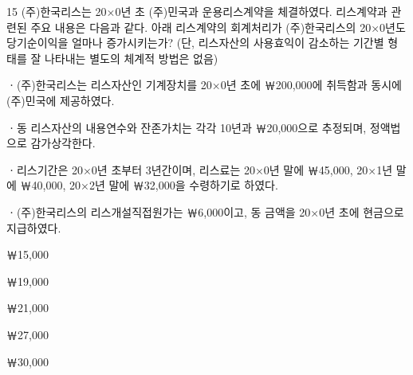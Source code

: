 \begin{question}{15}
(주)한국리스는 20×0년 초 (주)민국과 운용리스계약을 체결하였다. 리스계약과 관련된 주요 내용은 다음과 같다. 아래 리스계약의 회계처리가 (주)한국리스의 20×0년도 당기순이익을 얼마나 증가시키는가? (단, 리스자산의 사용효익이 감소하는 기간별 형태를 잘 나타내는 별도의 체계적 방법은 없음)
\begin{framedtext}
ㆍ(주)한국리스는 리스자산인 기계장치를 20×0년 초에 ￦200,000에 취득함과 동시에 (주)민국에 제공하였다. \par
ㆍ동 리스자산의 내용연수와 잔존가치는 각각 10년과 ￦20,000으로 추정되며, 정액법으로 감가상각한다. \par
ㆍ리스기간은 20×0년 초부터 3년간이며, 리스료는 20×0년 말에 ￦45,000, 20×1년 말에 ￦40,000, 20×2년 말에 ￦32,000을 수령하기로 하였다. \par
ㆍ(주)한국리스의 리스개설직접원가는 ￦6,000이고, 동 금액을 20×0년 초에 현금으로 지급하였다. \par
\end{framedtext}
\begin{choices}
  \item ￦15,000
  \item ￦19,000
  \item ￦21,000
  \item ￦27,000
  \item ￦30,000
\end{choices}
\end{question}
